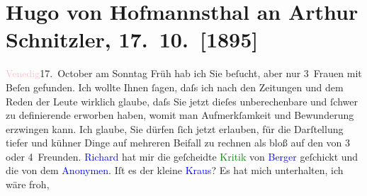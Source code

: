 

               \section[Hugo von Hofmannsthal an Arthur Schnitzler, 17. 10. {[}1895{]}]{ Hugo von Hofmannsthal an Arthur Schnitzler, 17. 10. {[}1895{]}}\nopagebreak{}\rehead{ }\normalsize\beginnumbering{} \toendnotes[C]{\smallbreak\pagebreak[2]} 
\toendnotes[C]{\smallbreak}\pstart
           \raggedleft{}{\pb}\textcolor{pink}{Venedig}{}\ledrightnote{\textcolor{pink}{Venedig}}{ }17. October\pend
           \pstart
           am Sonntag{ }Früh hab ich Sie beſucht, aber nur 3 Frauen mit Beſen gefunden. Ich
                    wollte Ihnen ſagen, daſs ich nach den Zeitungen und dem Reden der Leute wirklich
                    glaube, daſs Sie jetzt dieſes unberechenbare und ſchwer zu definierende erworben
                    haben, womit man Aufmerkſamkeit und Bewunderung erzwingen kann. Ich glaube, Sie
                    dürfen ſich jetzt erlauben, für die Darſtellung {\pb}tiefer und kühner Dinge auf
                    mehreren Beifall zu rechnen als bloß auf den von 3 oder 4 Freunden.\pend
           \pstart
           \textcolor{blue}{Richard}{}\ledrightnote{\textcolor{blue}{Richard Beer-Hofmann}} hat mir die geſcheidte \textcolor{green}{Kritik}{} von \textcolor{blue}{Berger}{}\ledrightnote{\textcolor{blue}{Alfred von Berger}} geſchickt und die \label{K_L00508_1v}\label{K_L00508_1h} von dem \textcolor{blue}{Anonymen}{}\ledrightnote{\textcolor{blue}{Der Reporter}}. Iſt es der kleine \textcolor{blue}{Kraus}{}\ledrightnote{\textcolor{blue}{Karl Kraus}}? Es hat mich unterhalten, ich wäre froh,
